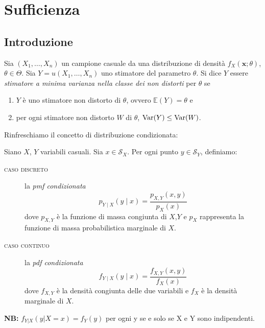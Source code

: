 
\chapter{Sufficienza}

\section{Introduzione}

\begin{dfn}
  Sia \((X_1,\dotsc,X_n)\) un campione casuale da una distribuzione di 
  densità \(f_X(\mathbf{x};\theta)\), \(\theta \in \Theta\). Sia
  \(Y = u(X_1,\dotsc,X_n)\) uno stimatore del parametro \(\theta\). Si dice
  \(Y\) essere \emph{stimatore a minima varianza nella classe dei non distorti} per \(\theta\) se
  \begin{enumerate}
    \item \(Y\) è uno stimatore non distorto di \(\theta\), ovvero
          \(\mathbb{E}(Y) = \theta\) e
    \item per ogni stimatore non distorto \(W\) di \(\theta\),
          \(\operatorname{Var}(Y) \le \operatorname{Var}(W)\).
  \end{enumerate}
\end{dfn}

Rinfreschiamo il concetto di distribuzione condizionata:
\begin{dfn}
Siano \(X\), \(Y\) variabili casuali. Sia \(x \in \mathcal{S}_X\).
Per ogni punto \(y \in \mathcal{S}_Y\), definiamo:
\begin{description}
  \item[\textsc{caso discreto}] la \emph{pmf condizionata}
  \begin{equation}
    p_{Y\mid X}(y \mid x) = \frac{p_{X,Y}(x,y)}{p_X(x)}
  \end{equation}
  dove \(p_{X,Y}\) è la funzione di massa congiunta di \(X\),\(Y\) e \(p_X\) rappresenta la funzione di massa probabilistica marginale di \(X\).
  \item[\textsc{caso continuo}] la \emph{pdf condizionata}
  \begin{equation}
    f_{Y\mid X}(y \mid x) = \frac{f_{X,Y}(x,y)}{f_X(x)}
  \end{equation}
  dove \(f_{X,Y}\) è la densità congiunta delle due variabili e \(f_X\) è la densità marginale di \(X\).
\end{description}
\end{dfn}

\noindent \textbf{NB:} $f_{Y|X}(y | X=x) = f_Y(y)$ per ogni y se e solo se X e Y sono indipendenti.

